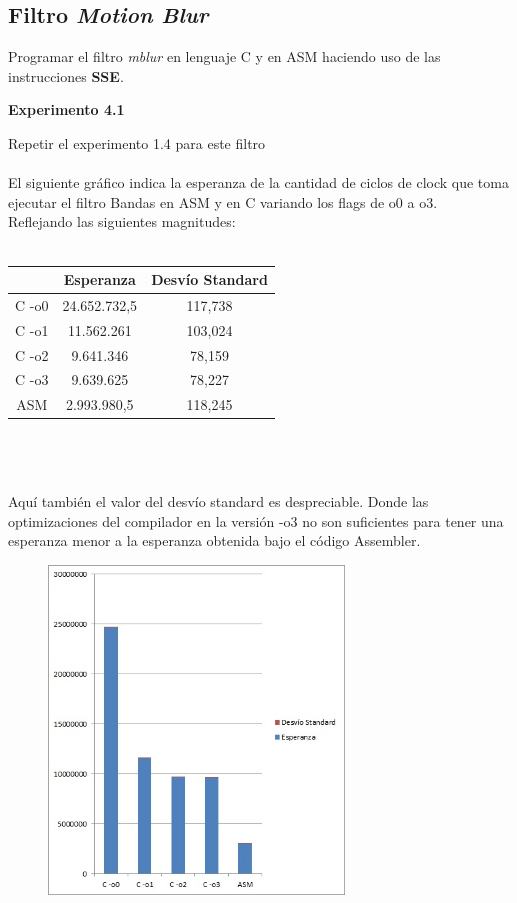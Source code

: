 
\subsection{Filtro \textit{Motion Blur}}
Programar el filtro \textit{mblur} en lenguaje C y en ASM haciendo uso de 
las instrucciones \textbf{SSE}.

\vspace*{0.3cm} \noindent
\textbf{Experimento 4.1}

Repetir el experimento 1.4 para este filtro \\
\\
El siguiente gr\'afico indica la esperanza de la cantidad de ciclos de clock que toma ejecutar el filtro Bandas en ASM y en C variando los flags de o0 a o3. \\
Reflejando las siguientes magnitudes: \\
\\
 \begin{tabular}[c]{|c|c|c|}
	\hline
		 & Esperanza & Desv\'io Standard\\
		\hline
C -o0 & 24.652.732,5 & 117,738 \\
\hline
C -o1 & 11.562.261 & 103,024  \\
\hline
C -o2 & 9.641.346 & 78,159  \\
\hline
C -o3 & 9.639.625 & 78,227 \\
\hline
ASM & 2.993.980,5 & 118,245 \\
\hline
	\end{tabular}\\\\
\\
Aqu\'i tambi\'en el valor del desv\'io standard es despreciable. Donde las optimizaciones del compilador en la versi\'on -o3 no son suficientes para tener una esperanza menor a la esperanza obtenida bajo el c\'odigo Assembler.\\
\newpage
\begin{figure}
  \begin{center}
	\includegraphics[width=0.7\textwidth]{imagenes/41.jpg}
  \end{center}
\end{figure}
\newpage